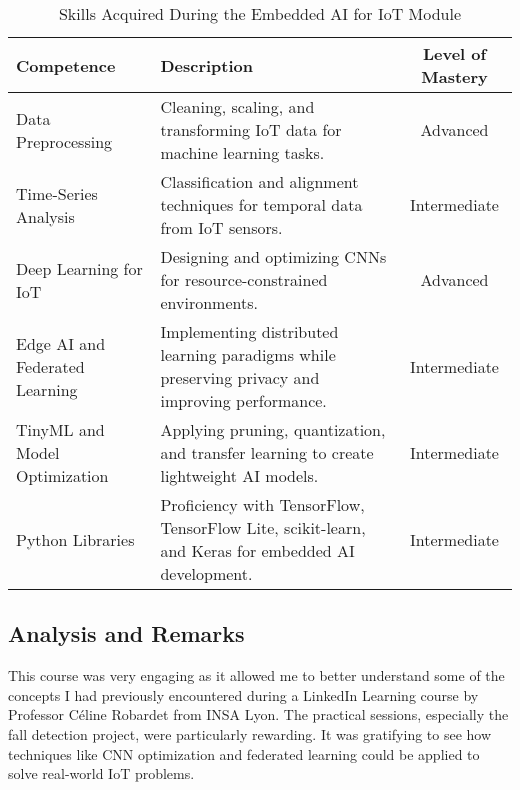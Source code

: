 \begin{table}[H]
    \centering
    \renewcommand{\arraystretch}{1.5}
    \begin{tabular}{|p{3.5cm}|p{8cm}|c|}
    \hline
    \rowcolor[gray]{0.8}
    \textbf{Competence} & \textbf{Description} & \textbf{Level of Mastery} \\ \hline
    Data Preprocessing & Cleaning, scaling, and transforming IoT data for machine learning tasks. & Advanced \\ \hline
    Time-Series Analysis & Classification and alignment techniques for temporal data from IoT sensors. & Intermediate \\ \hline
    Deep Learning for IoT & Designing and optimizing CNNs for resource-constrained environments. & Advanced \\ \hline
    Edge AI and Federated Learning & Implementing distributed learning paradigms while preserving privacy and improving performance. & Intermediate \\ \hline
    TinyML and Model Optimization & Applying pruning, quantization, and transfer learning to create lightweight AI models. & Intermediate \\ \hline
    Python Libraries & Proficiency with TensorFlow, TensorFlow Lite, scikit-learn, and Keras for embedded AI development. & Intermediate \\ \hline
    \end{tabular}
    \caption{Skills Acquired During the Embedded AI for IoT Module}
\end{table}

\subsection{Analysis and Remarks}
This course was very engaging as it allowed me to better understand some of the concepts I had previously encountered during a LinkedIn Learning course by Professor Céline Robardet from INSA Lyon. 
The practical sessions, especially the fall detection project, were particularly rewarding. 
It was gratifying to see how techniques like CNN optimization and federated learning could be applied to solve real-world IoT problems.
